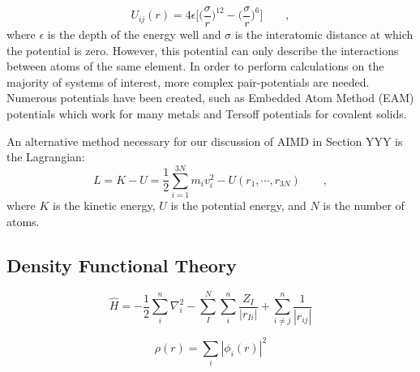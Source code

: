 \documentclass[3p,review,12pt]{elsarticle}
\begin{document}
\begin{equation}
U_{ij}(r) = 4\epsilon \Bigg[\bigg(\frac{\sigma}{r}\bigg)^{12}-\bigg(\frac{\sigma}{r}\bigg)^{6}\Bigg] \qquad ,
\end{equation}
where $\epsilon$ is the depth of the energy well and $\sigma$ is the interatomic distance at which the potential is zero. However, this potential can only describe the interactions between atoms of the same element. In order to perform calculations on the majority of systems of interest, more complex pair-potentials are needed. Numerous potentials have been created, such as Embedded Atom Method (EAM) potentials which work for many metals and Tersoff potentials for covalent solids. 
\par 
An alternative method necessary for our discussion of AIMD in Section YYY is the Lagrangian:
\begin{equation}
L = K-U = \frac{1}{2}\sum_{i=1}^{3N}m_{i}v^{2}_{i}-U(r_{1}, \cdots, r_{3N})\qquad ,
\end{equation}
where $K$ is the kinetic energy, $U$ is the potential energy, and $N$ is the number of atoms.







\subsection{Density Functional Theory}
\begin{equation}
\hat{H}=-\frac{1}{2}\sum_{i}^{n}\nabla_{i}^{2}-\sum_{I}^{N}\sum_{i}^{n}\frac{Z_{I}}{|r_{Ii}|}+\sum_{i\neq j}^{n}\frac{1}{|r_{ij}|}
\end{equation}

\begin{equation}
\rho (r) = \sum_{i}|\phi _{i}(r)|^{2}
\end{equation}
\end{document}
